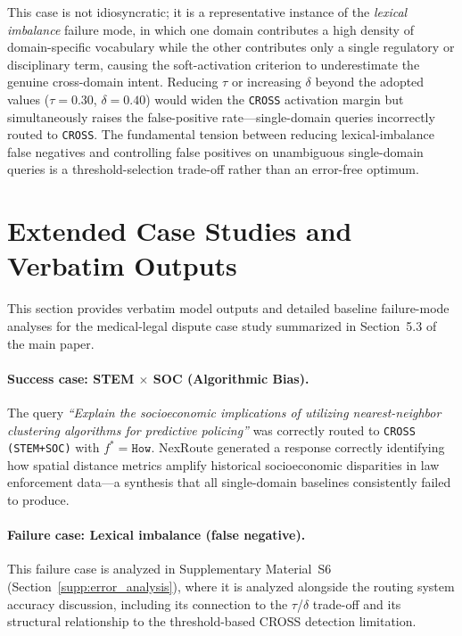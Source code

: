 \documentclass[a4paper,fleql,doubleblind]{cas-sc}
\begin{document}
This case is not idiosyncratic; it is a representative instance of the
\emph{lexical imbalance} failure mode, in which one domain contributes a high
density of domain-specific vocabulary while the other contributes only a single
regulatory or disciplinary term, causing the soft-activation criterion to
underestimate the genuine cross-domain intent. Reducing $\tau$ or increasing
$\delta$ beyond the adopted values ($\tau{=}0.30$, $\delta{=}0.40$) would
widen the \texttt{CROSS} activation margin but simultaneously raises the
false-positive rate---single-domain queries incorrectly routed to
\texttt{CROSS}. The fundamental tension between reducing lexical-imbalance false
negatives and controlling false positives on unambiguous single-domain queries
is a threshold-selection trade-off rather than an error-free optimum.

\section{Extended Case Studies and Verbatim Outputs}
\label{supp:casestudies}

This section provides verbatim model outputs and detailed baseline failure-mode
analyses for the medical-legal dispute case study summarized in Section~5.3 of
the main paper.

\paragraph{Success case: STEM $\times$ SOC (Algorithmic Bias).}
The query \textit{``Explain the socioeconomic implications of utilizing
nearest-neighbor clustering algorithms for predictive policing''} was
correctly routed to \texttt{CROSS (STEM+SOC)} with $f^* = \texttt{How}$.
NexRoute generated a response correctly identifying how spatial distance
metrics amplify historical socioeconomic disparities in law enforcement
data---a synthesis that all single-domain baselines consistently failed
to produce.

\paragraph{Failure case: Lexical imbalance (false negative).}
This failure case is analyzed in Supplementary Material~S6
(Section~\ref{supp:error_analysis}), where it is analyzed alongside the
routing system accuracy discussion, including its connection to the
$\tau$/$\delta$ trade-off and its structural relationship to the
threshold-based CROSS detection limitation.
\end{document}
